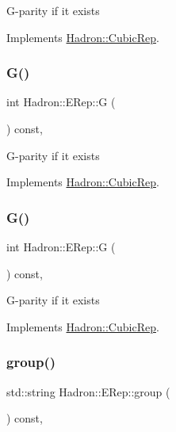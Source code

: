 G-\/parity if it exists 

Implements \mbox{\hyperlink{structHadron_1_1CubicRep_a52104e43266d1614c00bbd1c3b395458}{Hadron\+::\+Cubic\+Rep}}.

\mbox{\label{structHadron_1_1ERep_afc59abdfb3fdbbcddbe2dede52c570a6}} 
\subsubsection{\texorpdfstring{G()}{G()}\hspace{0.1cm}{\footnotesize\ttfamily [2/3]}}
{\footnotesize\ttfamily int Hadron\+::\+E\+Rep\+::G (\begin{DoxyParamCaption}{ }\end{DoxyParamCaption}) const\hspace{0.3cm}{\ttfamily [inline]}, {\ttfamily [virtual]}}

G-\/parity if it exists 

Implements \mbox{\hyperlink{structHadron_1_1CubicRep_a52104e43266d1614c00bbd1c3b395458}{Hadron\+::\+Cubic\+Rep}}.

\mbox{\label{structHadron_1_1ERep_afc59abdfb3fdbbcddbe2dede52c570a6}} 
\subsubsection{\texorpdfstring{G()}{G()}\hspace{0.1cm}{\footnotesize\ttfamily [3/3]}}
{\footnotesize\ttfamily int Hadron\+::\+E\+Rep\+::G (\begin{DoxyParamCaption}{ }\end{DoxyParamCaption}) const\hspace{0.3cm}{\ttfamily [inline]}, {\ttfamily [virtual]}}

G-\/parity if it exists 

Implements \mbox{\hyperlink{structHadron_1_1CubicRep_a52104e43266d1614c00bbd1c3b395458}{Hadron\+::\+Cubic\+Rep}}.

\mbox{\label{structHadron_1_1ERep_a832687372f6413d24ee1cf8c8b5c5f5f}} 
\subsubsection{\texorpdfstring{group()}{group()}\hspace{0.1cm}{\footnotesize\ttfamily [1/3]}}
{\footnotesize\ttfamily std\+::string Hadron\+::\+E\+Rep\+::group (\begin{DoxyParamCaption}{ }\end{DoxyParamCaption}) const\hspace{0.3cm}{\ttfamily [inline]}, {\ttfamily [virtual]}}

